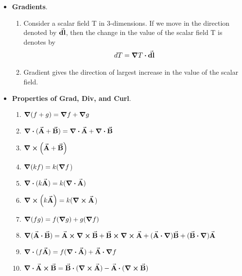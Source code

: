 \documentclass[12pt, oneside]{book}
\begin{document}
	\begin{itemize}
		
		\item \textbf{Gradients}. 
		\begin{enumerate}
		\item Consider a scalar field T in 3-dimensions. If we move in the direction denoted by $\va{\textbf{dl}}$, then the change in the value of the scalar field T is denotes by 
		\begin{equation}
			dT=\grad{T}\vdot \va{\textbf{dl}}
		\end{equation}
	    \item Gradient gives the direction of largest increase in the value of the scalar field.
	\end{enumerate}
      
      
       \item \textbf{Properties of Grad, Div, and Curl}.
       \begin{enumerate}
       	\item $\grad{(f+g)}=\grad{f}+\grad{g}$
       	
       	\item $\grad \vdot (\va{A}+\va{B})=\grad \vdot \va{A}+\grad \vdot \va{B}$
       	
       	\item $\curl (\va{A}+\va{B})$ 
       	

       	
       	
       	\item $\grad{(kf)}=k(\grad{f}$)
       	
       	\item $\div{(k\va{A})}=k(\div{\va{A}})$
       	
       	\item $\curl (k\va{A})=k( \curl{\va{A}}$)
       	
       	\item $\grad{(fg)}=f(\grad{g})+g(\grad{f})$
       	
       	\item $\grad{(\va{A}\vdot \va{B})}=\va{A}\cross\curl{\va{B}}+\va{B}\cross \curl{\va{A}}+(\va{A}\vdot \grad)\va{B}+(\va{B}\vdot \grad)\va{A}$
       	
       	\item $\div{(f\va{A})}=f(\div{\va{A}})+\va{A}\vdot\grad{f}$
       	
       	\item $\div{\va{A}\cross\va{B}}=\va{B}\vdot(\curl{\va{A}})-\va{A}\vdot(\curl{\va{B}})$
       	

\end{enumerate}
\end{itemize}
\end{document}
